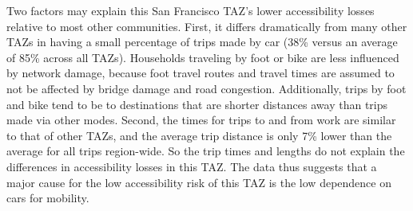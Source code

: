Two factors may explain this San Francisco TAZ's lower accessibility losses relative to most other communities.
First, it differs dramatically from many other TAZs in having a small percentage of trips made by car (38\% versus an average of 85\% across all TAZs). Households traveling by foot or bike are less influenced by network damage, because foot travel routes and travel times are assumed to not be affected by bridge damage and road congestion. Additionally, trips by foot and bike tend to be to destinations that are shorter distances away than trips made via other modes. 
 Second, the times for trips to and from work are similar to that of other TAZs, and the average trip distance is only 7\% lower than the average for all trips region-wide. So the trip times and lengths do not explain the differences in accessibility losses in this TAZ.
The data thus suggests that a major cause for the low accessibility risk of this TAZ is the low dependence on cars for mobility. 